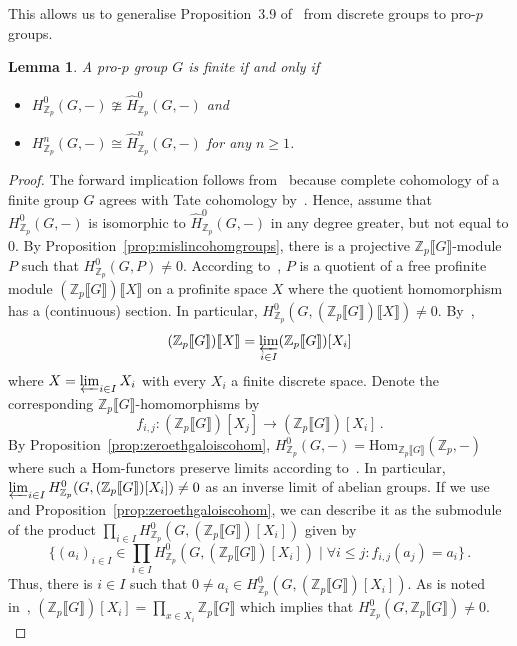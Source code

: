 \documentclass[12pt, a4paper]{article}
\numberwithin{equation}{section}
\newtheorem{lem}[thm]{Lemma}
\theoremstyle{empty}
\theoremstyle{nonumberplain}
\newtheorem{proof}{Proof}
\begin{document}
This allows us to generalise Proposition~3.9 of~\cite{jo04} from discrete groups to pro-$p$ groups.

\begin{lem}\label{lem:propgroupfinite}
A pro-$p$ group $G$ is finite if and only if
\begin{itemize}
\item $H_{\mathbb{Z}_p}^0(G, -) \ncong \widehat{H}_{\mathbb{Z}_p}^0(G, -)$ and
\item $H_{\mathbb{Z}_p}^n(G, -) \cong \widehat{H}_{\mathbb{Z}_p}^n(G, -)$ for any $n \geq 1$.
\end{itemize}
\end{lem}

\begin{proof}
The forward implication follows from~\cite[p.~78--79]{ade04} because complete cohomology of a finite group $G$ agrees with Tate cohomology by~\cite{mis94}. Hence, assume that $H_{\mathbb{Z}_p}^0(G, -)$ is isomorphic to $\widehat{H}_{\mathbb{Z}_p}^0(G, -)$ in any degree greater, but not equal to $0$. By Proposition~\ref{prop:mislincohomgroups}, there is a projective $\mathbb{Z}_p{\llbracket}G{\rrbracket}$-module $P$ such that $H_{\mathbb{Z}_p}^0(G, P) \neq 0$. According to~\cite[Lemma~5.2.5]{rib10}, $P$ is a quotient of a free profinite module $(\mathbb{Z}_p{\llbracket}G{\rrbracket}){\llbracket}X{\rrbracket}$ on a profinite space $X$ where the quotient homomorphism has a (continuous) section. In particular, $H_{\mathbb{Z}_p}^0(G, (\mathbb{Z}_p{\llbracket}G{\rrbracket}){\llbracket}X{\rrbracket}) \neq 0$. By~\cite[Proposition~5.2.2]{rib10},
\[ (\mathbb{Z}_p{\llbracket}G{\rrbracket}){\llbracket}X{\rrbracket} = \varprojlim_{i \in I} (\mathbb{Z}_p{\llbracket}G{\rrbracket})[X_i] \]
where $X = \varprojlim_{i \in I} X_i$ with every $X_i$ a finite discrete space. Denote the corresponding $\mathbb{Z}_p{\llbracket}G{\rrbracket}$-homomorphisms by 
\[ f_{i, j}: (\mathbb{Z}_p{\llbracket}G{\rrbracket})[X_j] \rightarrow (\mathbb{Z}_p{\llbracket}G{\rrbracket})[X_i] \, . \]
By Proposition~\ref{prop:zeroethgaloiscohom}, $H_{\mathbb{Z}_p}^0(G, -) = \mathrm{Hom}_{\mathbb{Z}_p{\llbracket}G{\rrbracket}}(\mathbb{Z}_p, -)$ where such a Hom-functors preserve limits according to~\cite[p.~116]{mac78}. In particular, $\varprojlim_{i \in I} H_{\mathbb{Z}_p}^0(G, (\mathbb{Z}_p{\llbracket}G{\rrbracket})[X_i]) \neq 0$ as an inverse limit of abelian groups. If we use~\cite[p.~2--3]{rib10} and Proposition~\ref{prop:zeroethgaloiscohom}, we can describe it as the submodule of the product $\prod_{i \in I} H_{\mathbb{Z}_p}^0(G, (\mathbb{Z}_p{\llbracket}G{\rrbracket})[X_i])$ given by
\[ \Big\lbrace (a_i)_{i \in I} \in \prod_{i \in I} H_{\mathbb{Z}_p}^0(G, (\mathbb{Z}_p{\llbracket}G{\rrbracket})[X_i]) \mid \forall i \leq j: f_{i, j}(a_j) = a_i \Big\rbrace \, . \]
Thus, there is $i \in I$ such that $0 \neq a_i \in H_{\mathbb{Z}_p}^0(G, (\mathbb{Z}_p{\llbracket}G{\rrbracket})[X_i])$. As is noted in~\cite[p.~167]{rib10}, $(\mathbb{Z}_p{\llbracket}G{\rrbracket})[X_i] = \prod_{x \in X_i} \mathbb{Z}_p{\llbracket}G{\rrbracket}$ which implies that $H_{\mathbb{Z}_p}^0(G, \mathbb{Z}_p{\llbracket}G{\rrbracket}) \neq 0$. \\


\end{proof}
\end{document}
